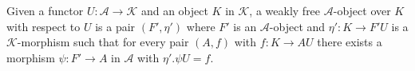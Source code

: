 Given a functor $U: \mathcal{A} \longrightarrow \mathcal{K}$ and an object $K$ in $\mathcal{K}$, a weakly free $\mathcal{A}$-object over $K$ with respect to $U$ is a pair $(F', \eta')$ where $F'$ is an $\mathcal{A}$-object and $\eta': K \longrightarrow F'U$ is a $\mathcal{K}$-morphism such that for every pair $(A, f)$ with $f: K \longrightarrow AU$ there exists a morphism $\psi: F' \longrightarrow A$ in $\mathcal{A}$ with $\eta'.\psi U = f$.
